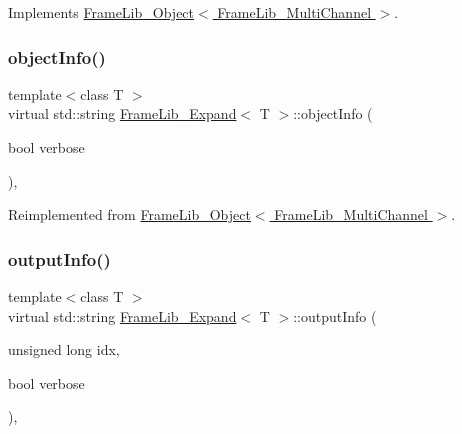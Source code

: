 Implements \hyperlink{class_frame_lib___object_a6c5d94f1577471d33204078e86f51ff3}{Frame\+Lib\+\_\+\+Object$<$ Frame\+Lib\+\_\+\+Multi\+Channel $>$}.

\mbox{\label{class_frame_lib___expand_ac4527eab2bfb55a38bd796d95f2a2562}} 
\subsubsection{\texorpdfstring{object\+Info()}{objectInfo()}}
{\footnotesize\ttfamily template$<$class T $>$ \\
virtual std\+::string \hyperlink{class_frame_lib___expand}{Frame\+Lib\+\_\+\+Expand}$<$ T $>$\+::object\+Info (\begin{DoxyParamCaption}\item[{bool}]{verbose }\end{DoxyParamCaption})\hspace{0.3cm}{\ttfamily [inline]}, {\ttfamily [virtual]}}



Reimplemented from \hyperlink{class_frame_lib___object_a10d673de9a3c59ace6a22ba1cff313c8}{Frame\+Lib\+\_\+\+Object$<$ Frame\+Lib\+\_\+\+Multi\+Channel $>$}.

\mbox{\label{class_frame_lib___expand_abba12bed97c0b76095f1e1a699591b3e}} 
\subsubsection{\texorpdfstring{output\+Info()}{outputInfo()}}
{\footnotesize\ttfamily template$<$class T $>$ \\
virtual std\+::string \hyperlink{class_frame_lib___expand}{Frame\+Lib\+\_\+\+Expand}$<$ T $>$\+::output\+Info (\begin{DoxyParamCaption}\item[{unsigned long}]{idx,  }\item[{bool}]{verbose }\end{DoxyParamCaption})\hspace{0.3cm}{\ttfamily [inline]}, {\ttfamily [virtual]}}



